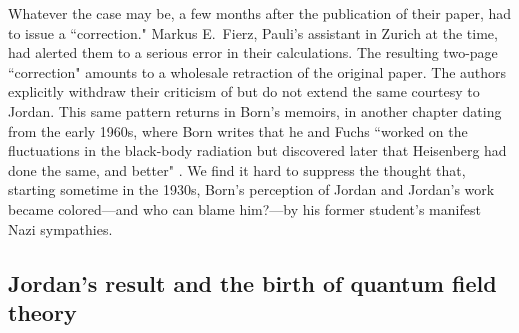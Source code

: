 \documentclass{elsart}
\begin{document}
Whatever the case may be, a few months after the publication of their paper, \citet{Born and Fuchs 1939b} had to issue a ``correction."   Markus E.\ Fierz, Pauli's assistant in Zurich at the time, had alerted them to a serious error in their calculations. The resulting two-page ``correction" amounts to a wholesale retraction of the original paper. The authors explicitly withdraw their criticism of \citep{Heisenberg 1931} but do not extend the same courtesy to Jordan. This same pattern returns in Born's memoirs, in another chapter dating from the early 1960s, where Born writes that he and Fuchs ``worked on the fluctuations in the black-body radiation but discovered later that Heisenberg had done the same, and better" \citep[p.\ 285]{Born 1978}. We find it hard to suppress the thought that, starting sometime in the 1930s, Born's perception of Jordan and Jordan's work became colored---and who can blame him?---by his former student's manifest Nazi sympathies. 

\subsection{Jordan's result and the birth of quantum field theory}
\end{document}
